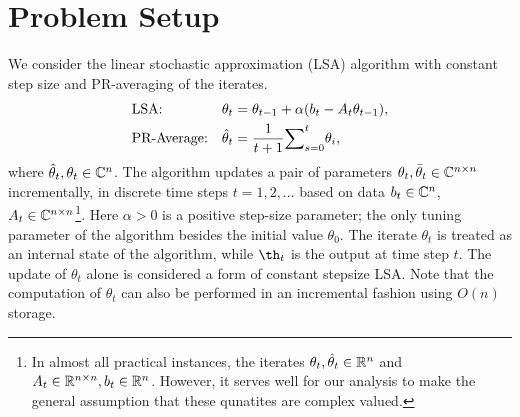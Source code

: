 \section{Problem Setup}
We consider the linear stochastic approximation (LSA) algorithm with constant step size and PR-averaging of the iterates.
\begin{subequations}\label{eq:lsa}
\begin{align}
\label{conststep}&\text{LSA:} &\theta_t&=\theta_{t-1}+\alpha(b_t-A_t\theta_{t-1}),\\
\label{iteravg}&\text{PR-Average:} &\hat{\theta}_t&=\frac{1}{t+1}{\sum}_{s=0}^{t}\theta_i,
\end{align}
\end{subequations}
where $\hat{\theta}_t, \theta_t \in \mathbb{C}^{n}$. The algorithm updates a pair of parameters $\theta_t,\bar{\theta}_t\in \mathbb{C}^{n\times n}$ incrementally, in discrete time steps $t=1,2,\dots$
based on data $b_t\in \mathbb{C}^n$, $A_t\in \mathbb{C}^{n\times n}$\footnote{In almost all practical instances, the iterates $\theta_t,\hat{\theta}_t\in \mathbb{R}^n$ and $A_t\in \mathbb{R}^{n\times n}, b_t\in \mathbb{R}^n$. However, it serves well for our analysis to make the general assumption that these qunatites are complex valued.}. Here $\alpha>0$ is a positive step-size parameter; the only tuning parameter of the algorithm besides the
initial value $\theta_0$. The iterate $\theta_t$ is treated as an internal state of the algorithm, while $\th_t$ is the output at time step $t$. The update of $\theta_t$ alone is considered a form of constant stepsize LSA. Note that the computation of $\theta_t$ can also be performed in an incremental fashion using $O(n)$ storage.

